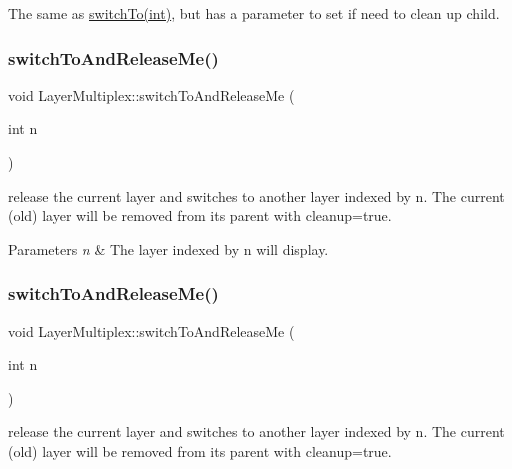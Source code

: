 The same as \hyperlink{classLayerMultiplex_a2c9ab67b2b94e447a92d94fb28d45f89}{switch\+To(int)}, but has a parameter to set if need to clean up child. \mbox{\label{classLayerMultiplex_a50d274d3addfaf7140a48da909a60ea8}} 
\subsubsection{\texorpdfstring{switch\+To\+And\+Release\+Me()}{switchToAndReleaseMe()}\hspace{0.1cm}{\footnotesize\ttfamily [1/2]}}
{\footnotesize\ttfamily void Layer\+Multiplex\+::switch\+To\+And\+Release\+Me (\begin{DoxyParamCaption}\item[{int}]{n }\end{DoxyParamCaption})}

release the current layer and switches to another layer indexed by n. The current (old) layer will be removed from it\textquotesingle{}s parent with \textquotesingle{}cleanup=true\textquotesingle{}.


\begin{DoxyParams}{Parameters}
{\em n} & The layer indexed by n will display. \\
\hline
\end{DoxyParams}
\mbox{\label{classLayerMultiplex_a50d274d3addfaf7140a48da909a60ea8}} 
\subsubsection{\texorpdfstring{switch\+To\+And\+Release\+Me()}{switchToAndReleaseMe()}\hspace{0.1cm}{\footnotesize\ttfamily [2/2]}}
{\footnotesize\ttfamily void Layer\+Multiplex\+::switch\+To\+And\+Release\+Me (\begin{DoxyParamCaption}\item[{int}]{n }\end{DoxyParamCaption})}

release the current layer and switches to another layer indexed by n. The current (old) layer will be removed from it\textquotesingle{}s parent with \textquotesingle{}cleanup=true\textquotesingle{}.


